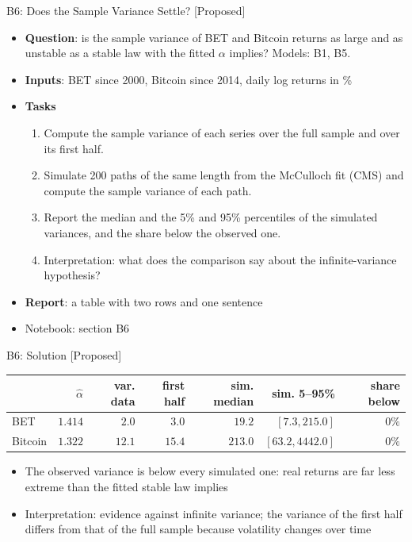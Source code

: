 \begin{frame}{B6: Does the Sample Variance Settle? [Proposed]}
\itemsize{\footnotesize}
\begin{itemize}
\item \textbf{Question}: is the sample variance of BET and Bitcoin returns as large and as unstable as a stable law with the fitted $\alpha$ implies? Models: B1, B5.
\item \textbf{Inputs}: BET since 2000, Bitcoin since 2014, daily log returns in \%
\item \textbf{Tasks}
\begin{enumerate}
    \item Compute the sample variance of each series over the full sample and over its first half.
    \item Simulate 200 paths of the same length from the McCulloch fit (CMS) and compute the sample variance of each path.
    \item Report the median and the 5\% and 95\% percentiles of the simulated variances, and the share below the observed one.
    \item Interpretation: what does the comparison say about the infinite-variance hypothesis?
\end{enumerate}
\item \textbf{Report}: a table with two rows and one sentence
\item Notebook: section B6
\end{itemize}
\end{frame}

\ifsolutions
\begin{frame}{B6: Solution [Proposed]}
\itemsize{\footnotesize}
\begin{center}
\footnotesize
\begin{tabular}{lrrrrrr}
\toprule
& $\hat\alpha$ & var. data & first half & sim. median & sim. 5--95\% & share below \\
\midrule
BET & $1.414$ & $2.0$ & $3.0$ & $19.2$ & $[7.3, 215.0]$ & $0\%$ \\
Bitcoin & $1.322$ & $12.1$ & $15.4$ & $213.0$ & $[63.2, 4442.0]$ & $0\%$ \\
\bottomrule
\end{tabular}
\end{center}
\begin{itemize}
    \item The observed variance is below every simulated one: real returns are far less extreme than the fitted stable law implies
    \item Interpretation: evidence against infinite variance; the variance of the first half differs from that of the full sample because volatility changes over time
\end{itemize}
\end{frame}
\fi


